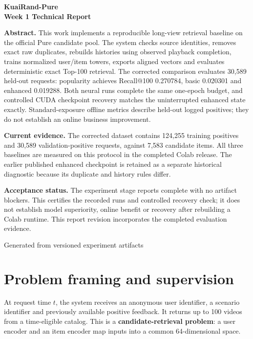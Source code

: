 \documentclass[11pt,a4paper]{article}
\begin{document}
\begin{titlepage}
\centering\vspace*{1.3cm}
{\Huge\bfseries KuaiRand-Pure\\[.3cm]Week 1 Technical Report\par}
\vspace{.5cm}{\Large Two-Tower Retrieval Baselines and Evaluation\par}
\vspace{.5cm}{\large SAR Recommendation Project\par}
\vspace{.7cm}
\vspace{1cm}
\begin{minipage}{.88\textwidth}
\textbf{Abstract.} This work implements a reproducible long-view retrieval baseline on the official Pure candidate pool. The system checks source identities, removes exact raw duplicates, rebuilds histories using observed playback completion, trains normalized user/item towers, exports aligned vectors and evaluates deterministic exact Top-100 retrieval. The corrected comparison evaluates 30,589 held-out requests: popularity achieves Recall@100 0.270784, basic 0.020301 and enhanced 0.019288. Both neural runs complete the same one-epoch budget, and controlled CUDA checkpoint recovery matches the uninterrupted enhanced state exactly. Standard-exposure offline metrics describe held-out logged positives; they do not establish an online business improvement.

\medskip\textbf{Current evidence.} The corrected dataset contains 124,255 training positives and 30,589 validation-positive requests, against 7,583 candidate items. All three baselines are measured on this protocol in the completed Colab release. The earlier published enhanced checkpoint is retained as a separate historical diagnostic because its duplicate and history rules differ.

\medskip\textbf{Acceptance status.} The experiment stage reports complete with no artifact blockers. This certifies the recorded runs and controlled recovery check; it does not establish model superiority, online benefit or recovery after rebuilding a Colab runtime. This report revision incorporates the completed evaluation evidence.
\end{minipage}
\vfill{\large Generated from versioned experiment artifacts\par}
\end{titlepage}
\section{Problem framing and supervision}
At request time $t$, the system receives an anonymous user identifier, a scenario identifier and previously available positive feedback. It returns up to 100 videos from a time-eligible catalog. This is a \textbf{candidate-retrieval problem}: a user encoder and an item encoder map inputs into a common 64-dimensional space.
\end{document}
